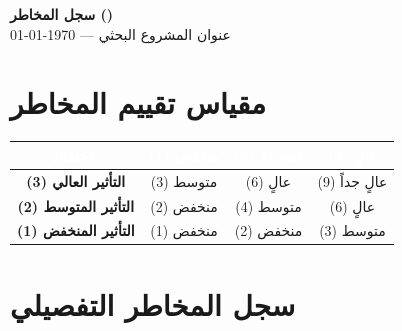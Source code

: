 \documentclass[11pt,a4paper,landscape]{article}
\begin{document}
\begin{center}
{\LARGE\bfseries سجل المخاطر ()}\\[0.3em]
{\large عنوان المشروع البحثي — \today}\\[1em]
\end{center}

\section*{مقياس تقييم المخاطر}

\begin{center}
\renewcommand{\arraystretch}{1.4}
\begin{tabular}{|c|c|c|c|}
\hline
\rowcolor{headerColor}
\textcolor{white}{\textbf{الاحتمال}} & \textcolor{white}{\textbf{منخفض (1)}} & \textcolor{white}{\textbf{متوسط (2)}} & \textcolor{white}{\textbf{عالٍ (3)}} \\
\hline
\textbf{التأثير العالي (3)} & \cellcolor{riskMed}متوسط (3) & \cellcolor{riskHigh}عالٍ (6) & \cellcolor{riskHigh}عالٍ جداً (9) \\
\hline
\textbf{التأثير المتوسط (2)} & \cellcolor{riskLow}منخفض (2) & \cellcolor{riskMed}متوسط (4) & \cellcolor{riskHigh}عالٍ (6) \\
\hline
\textbf{التأثير المنخفض (1)} & \cellcolor{riskLow}منخفض (1) & \cellcolor{riskLow}منخفض (2) & \cellcolor{riskMed}متوسط (3) \\
\hline
\end{tabular}
\end{center}

\vspace{1em}

\section*{سجل المخاطر التفصيلي}
\end{document}
